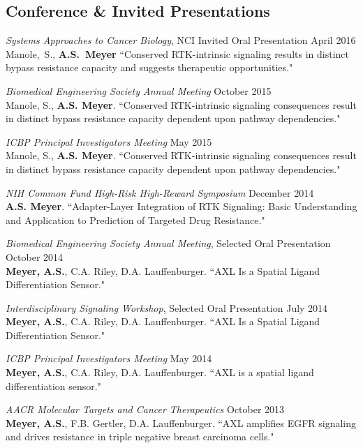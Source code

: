 \documentclass[11pt]{res}
\begin{document}
\begin{resume}
\section{Conference \& Invited Presentations}

{\sl Systems Approaches to Cancer Biology}, NCI Invited Oral Presentation \hfill April 2016 \\
Manole,~S., {\bf A.S.~Meyer} ``Conserved RTK-intrinsic signaling results in distinct bypass resistance capacity and suggests therapeutic opportunities."

{\sl Biomedical Engineering Society Annual Meeting} \hfill October 2015 \\
Manole, S., {\bf A.S. Meyer}. ``Conserved RTK-intrinsic signaling consequences result in distinct bypass resistance capacity dependent upon pathway dependencies."

{\sl ICBP Principal Investigators Meeting} \hfill May 2015 \\
Manole, S., {\bf A.S. Meyer}. ``Conserved RTK-intrinsic signaling consequences result in distinct bypass resistance capacity dependent upon pathway dependencies."

\clearpage

{\sl NIH Common Fund High-Risk High-Reward Symposium} \hfill December 2014 \\
{\bf A.S. Meyer}. ``Adapter-Layer Integration of RTK Signaling: Basic Understanding and Application to Prediction of Targeted Drug Resistance."

{\sl Biomedical Engineering Society Annual Meeting}, Selected Oral Presentation \hfill October 2014 \\
{\bf Meyer, A.S.}, C.A. Riley, D.A. Lauffenburger. ``AXL Is a Spatial Ligand Differentiation Sensor."

{\sl Interdisciplinary Signaling Workshop}, Selected Oral Presentation \hfill July 2014 \\
{\bf Meyer, A.S.}, C.A. Riley, D.A. Lauffenburger. ``AXL Is a Spatial Ligand Differentiation Sensor."

{\sl ICBP Principal Investigators Meeting} \hfill May 2014 \\
{\bf Meyer, A.S.}, C.A. Riley, D.A. Lauffenburger. ``AXL is a spatial ligand differentiation sensor."

{\sl AACR Molecular Targets and Cancer Therapeutics} \hfill October 2013 \\
{\bf Meyer, A.S.}, F.B. Gertler, D.A. Lauffenburger. ``AXL amplifies EGFR signaling and drives resistance in triple negative breast carcinoma cells."


\end{resume}
\end{document}
